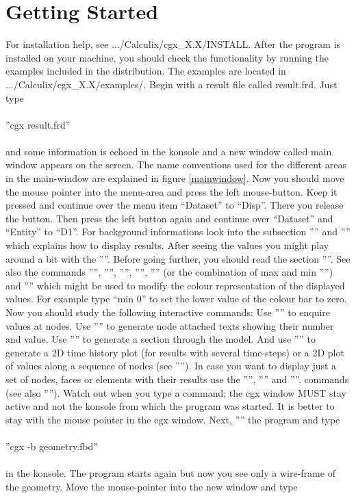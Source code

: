 \documentclass{article}
\begin{document}
\section{\label{Getting Started}Getting Started}
For installation help, see .../Calculix/cgx\_X.X/INSTALL. After the program is installed on your machine, you should check the functionality by running the examples included in the distribution. The examples are located in .../Calculix/cgx\_X.X/examples/. Begin with a result file called result.frd. Just type\\\\  ''cgx result.frd''\\\\and some information is echoed in the konsole and a new window called main window appears on the screen. The name conventions used for the different areas in the main-window are explained in figure \ref{mainwindow}. Now you should move the mouse pointer into the menu-area and press the left mouse-button. Keep it pressed and continue over the menu item ``Dataset'' to ``Disp''. There you release the button. Then press the left button again and continue over ``Dataset'' and ``Entity'' to ``D1''. For background informations look into the subsection '''' and '''' which explains how to display results. After seeing the values you might play around a bit with the ''''. Before going further, you should read the section ''''. See also the commands '''', '''', '''', '''', '''' (or the combination of max and min '''') and '''' which might be used to modify the colour representation of the displayed values. For example type ``min 0'' to set the lower value of the colour bar to zero. Now you should study the following interactive commands: Use '''' to enquire values at nodes. Use '''' to generate node attached texts showing their number and value. Use '''' to generate a section through the model. And use '''' to generate a 2D time history plot (for results with several time-steps) or a 2D plot of values along a sequence of nodes (see ''''). In case you want to display just a set of nodes, faces or elements with their results use the '''', '''' and ''''. commands (see also '''').  Watch out when you type a command; the cgx window MUST stay active and not the konsole from which the program was started. It is better to stay with the mouse pointer in the cgx window. Next, '''' the program and type\\\\  ''cgx -b geometry.fbd''\\\\in the konsole. The program starts again but now you see only a wire-frame of the geometry. Move the mouse-pointer into the new window and type 
\end{document}
